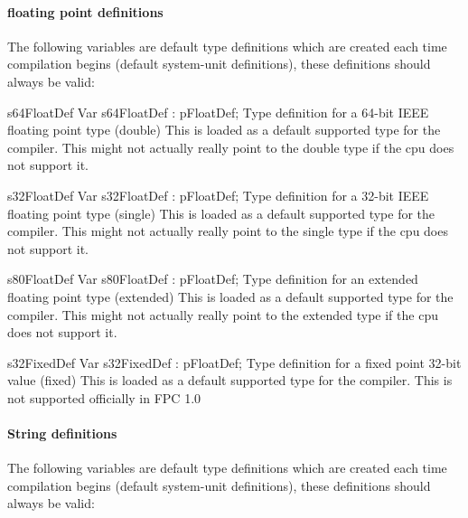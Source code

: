 \documentclass [a4paper,12pt]{article}
\begin{document}
\paragraph{floating point definitions}

The following variables are default type definitions which are created each
time compilation begins (default system-unit definitions), these definitions
should always be valid:

\begin{variable}{s64FloatDef}
\Declaration
Var s64FloatDef : pFloatDef;
\Description
Type definition for a 64-bit IEEE floating point type (\textsf{double})
\Notes
This is loaded as a default supported type for the compiler. This might not
actually really point to the double type if the cpu does not support it.
\end{variable}

\begin{variable}{s32FloatDef}
\Declaration
Var s32FloatDef : pFloatDef;
\Description
Type definition for a 32-bit IEEE floating point type (\textsf{single})
\Notes
This is loaded as a default supported type for the compiler. This might not
actually really point to the single type if the cpu does not support it.
\end{variable}

\begin{variable}{s80FloatDef}
\Declaration
Var s80FloatDef : pFloatDef;
\Description
Type definition for an extended floating point type (\textsf{extended})
\Notes
This is loaded as a default supported type for the compiler. This
might not actually really point to the extended type if the cpu does not
support it.
\end{variable}

\begin{variable}{s32FixedDef}
\Declaration
Var s32FixedDef : pFloatDef;
\Description
Type definition for a fixed point 32-bit value (\textsf{fixed})
\Notes
This is loaded as a default supported type for the compiler. This is
not supported officially in FPC 1.0
\end{variable}

\clearpage

\paragraph{String definitions}
The following variables are default type definitions which are created each
time compilation begins (default system-unit definitions), these definitions
should always be valid:
\end{document}

